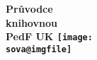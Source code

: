 \documentclass[12pt ]{leaflet}
\newenvironment{page}{}{\clearpage}
\begin{document}
\makeatletter
\raggedright
\begin{page}
  \bgroup
  \null
  \vfill
  \fontsize{48}{62}\selectfont\bfseries
 Průvodce\\knihovnou\\PedF UK
  \vfill
  \null\hfill
  \texttt{[image: \\sova@imgfile]}
  \hfill\null
  \fontsize{16}{68}\selectfont%
  \normalfont
  
  \egroup
\end{page}
\makeatother

\begin{page}
  
\end{page}



\end{document}
